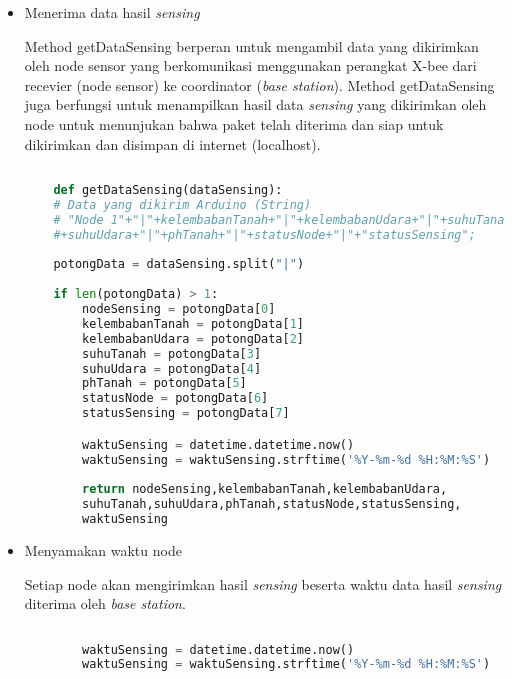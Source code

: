    
   \begin{itemize}
       \item Menerima data hasil \textit{sensing}
       
       Method getDataSensing berperan untuk mengambil data yang dikirimkan oleh node sensor yang berkomunikasi menggunakan perangkat X-bee dari recevier (node sensor) ke coordinator (\textit{base station}). Method getDataSensing juga berfungsi untuk menampilkan hasil data \textit{sensing} yang dikirimkan oleh node untuk menunjukan bahwa paket telah diterima dan siap untuk dikirimkan dan disimpan di internet (localhost).
   
   \begin{lstlisting}[label=getDataSensing, language=Python, caption=Metode getDataSensing(), numbers=none]
    
    def getDataSensing(dataSensing):
    # Data yang dikirim Arduino (String)
    # "Node 1"+"|"+kelembabanTanah+"|"+kelembabanUdara+"|"+suhuTanah+"|"
    #+suhuUdara+"|"+phTanah+"|"+statusNode+"|"+"statusSensing";
    
    potongData = dataSensing.split("|")
    
    if len(potongData) > 1:
        nodeSensing = potongData[0]
        kelembabanTanah = potongData[1]
        kelembabanUdara = potongData[2]
        suhuTanah = potongData[3]
        suhuUdara = potongData[4]
        phTanah = potongData[5]
        statusNode = potongData[6]
        statusSensing = potongData[7]

        waktuSensing = datetime.datetime.now()
        waktuSensing = waktuSensing.strftime('%Y-%m-%d %H:%M:%S')
        
        return nodeSensing,kelembabanTanah,kelembabanUdara,
        suhuTanah,suhuUdara,phTanah,statusNode,statusSensing,
        waktuSensing
    \end{lstlisting}
    
        \item Menyamakan waktu node
        
        Setiap node akan mengirimkan hasil \textit{sensing} beserta waktu data hasil \textit{sensing} diterima oleh \textit{base station}.
        
        \begin{lstlisting}[label=getDataSensing, language=Python, caption=Metode getDataSensing(), numbers=none]
        
        waktuSensing = datetime.datetime.now()
        waktuSensing = waktuSensing.strftime('%Y-%m-%d %H:%M:%S')
            

\end{lstlisting}
\end{itemize}
